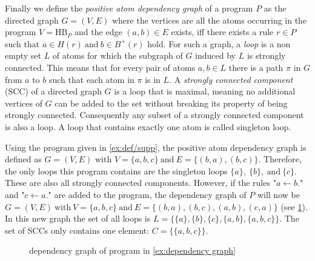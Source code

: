 Finally we define the \emph{positive atom dependency graph} of a program $P$ as the directed graph \(G = (V, E)\) where the vertices are all the atoms occurring in the program \(V = \text{HB}_P\) and the edge \((a,b) \in E\) exists, iff there exists a rule \(r \in P\) such that \(a \in H(r) \ \text{and}\ b \in B^+(r)\) hold.
For such a graph, a \emph{loop} is a non empty set $L$ of atoms for which the subgraph of $G$ induced by $L$ is strongly connected. This means that for every pair of atoms \(a,b \in L\) there is a path $\pi$ in $G$ from $a$ to $b$ such that each atom in $\pi$ is in $L$.
A \emph{strongly connected component} (SCC) of a directed graph $G$ is a loop that is maximal, meaning no additional vertices of $G$ can be added to the set without breaking its property of being strongly connected. Consequently any subset of a strongly connected component is also a loop.
A loop that contains exactly one atom is called singleton loop.
\begin{example}
\label{ex:dependency graph}
    Using the program given in \cref{ex:def/supp}, the positive atom dependency graph is defined as \(G = (V, E)\) with \(V = \{a, b, c\}\ \text{and}\ E = \{(b, a), (b, c)\}\). Therefore, the only loops this program contains are the singleton loops \(\{a\},\ \{b\},\ \text{and}\ \{c\}\). These are also all strongly connected components. 
    However, if the rules "\(a \leftarrow b.\)" and "\(c \leftarrow a.\)" are added to the program, the dependency graph of $P$ will now be \(G = (V, E)\ \text{with}\ V = \{a,b,c\}\ \text{and}\ E = \{(b,a), (b,c), (a,b), (c,a)\}\) (see \cref{fig:dependency graph}). In this new graph the set of all loops is \(L = \{\{a\},\{b\},\{c\},\{a,b\},\{a,b,c\}\}\). The set of SCCs only contains one element: \(C = \{\{a,b,c\}\}\).
\end{example}

\begin{figure}[h]
    \centering
    \caption{dependency graph of program in \cref{ex:dependency graph}}
    \label{fig:dependency graph}
\end{figure}


